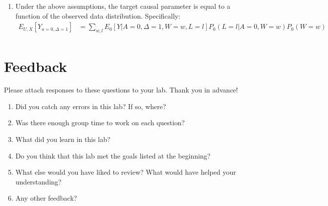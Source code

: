 \documentclass[answers]{exam}
\begin{document}
\begin{solution}
\begin{enumerate}
\item Under the above assumptions, the target causal parameter is equal to a function of the observed data distribution. Specifically:
\begin{align*}
E_{U,X}[Y_{a=0, \Delta = 1}] & = \sum_{w, l}E_0[Y|A=0,\Delta=1,W=w,L=l]P_0(L=l|A=0,W=w)P_0(W=w) \\
\end{align*}


\end{enumerate}

\end{solution}

\pagebreak


\section{Feedback}

Please attach responses to these questions to your lab. Thank you in advance!

\begin{enumerate}
\item Did you catch any errors in this lab? If so, where?
\item Was there enough group time to work on each question?
\item What did you learn in this lab?
\item Do you think that this lab met the goals listed at the beginning? 
\item What else would you have liked to review? What would have helped your understanding?
\item Any other feedback?
\end{enumerate}
\end{document}
